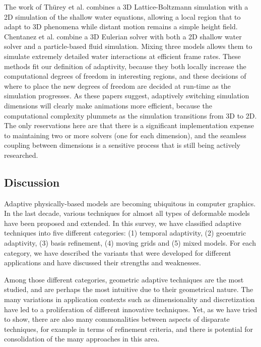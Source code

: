 The work of Th\"urey et al. \cite{Thurey2006} combines a 3D Lattice-Boltzmann simulation with a 2D simulation of the shallow water equations, allowing a local region that to adapt to 3D phenomena while distant motion remains a simple height field. Chentanez et al. \cite{Chentanez2014} combine a 3D Eulerian solver with both a 2D shallow water solver and a particle-based fluid simulation. Mixing three models allows them to simulate extremely detailed water interactions at efficient frame rates. These methods fit our definition of adaptivity, because they both locally increase the computational degrees of freedom in interesting regions, and these decisions of where to place the new degrees of freedom are decided at run-time as the simulation progresses. As these papers suggest, adaptively switching simulation dimensions will clearly make animations more efficient, because the computational complexity plummets as the simulation transitions from 3D to 2D. The only reservations here are that there is a significant implementation expense to maintaining two or more solvers (one for each dimension), and the seamless coupling between dimensions is a sensitive process that is still being actively researched.


\subsection{Discussion} \label{sec conclusion}

Adaptive physically-based models are becoming ubiquitous in computer graphics.
In the last decade, various techniques for almost all types of deformable models have been proposed and extended.
In this survey, we have classified adaptive techniques into five different categories: (1) temporal adaptivity, (2) geoemtric adaptivity, (3) basis refinement, (4) moving grids and (5) mixed models.
For each category, we have described the variants that were developed for different applications and have discussed their strengths and weaknesses.

Among those different categories, geometric adaptive techniques are the most studied, and are perhaps the most intuitive due to their geometrical nature.
The many variations in application contexts such as dimensionality and discretization have led to a proliferation of different innovative techniques.
Yet, as we have tried to show, there are also many commonalities between aspects of disparate techniques, for example in terms of refinement criteria, and there is potential for consolidation of the many approaches in this area.

